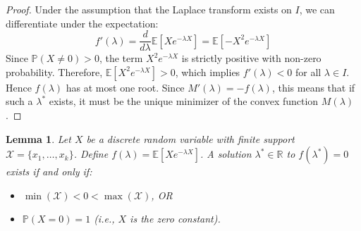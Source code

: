 \documentclass[12pt]{article}
\numberwithin{equation}{section}
\newtheorem{lemma}{Lemma}[section]
\begin{document}
\begin{proof}
    Under the assumption that the Laplace transform exists on \(I\), we can differentiate under the expectation:
    \[
    f'(\lambda) = \frac{d}{d\lambda}\mathbb{E}[Xe^{-\lambda X}] = \mathbb{E}[-X^2e^{-\lambda X}]
    \]
    Since \(\mathbb{P}(X\neq 0)>0\), the term \(X^2e^{-\lambda X}\) is strictly positive with non-zero probability. Therefore, \(\mathbb{E}[X^2e^{-\lambda X}]>0\), which implies \(f'(\lambda)<0\) for all \(\lambda \in I\). Hence \(f(\lambda)\) has at most one root. Since \(M'(\lambda) = - f(\lambda)\), this means that if such a \(\lambda^{*}\) exists, it must be the unique minimizer of the convex function \(M(\lambda)\).
\end{proof}

\begin{lemma}\label{existence_1}
    Let \(X\) be a discrete random variable with finite support \(\mathcal{X} = \{x_1,\ldots , x_k\}\). Define \(f(\lambda) = \mathbb{E}[Xe^{-\lambda X}]\). A solution \(\lambda^{*}\in\mathbb{R}\) to \(f(\lambda^{*}) = 0\) exists if and only if:
    \begin{itemize}
        \item \(\min(\mathcal{X}) < 0 < \max(\mathcal{X})\), OR
        \item \(\mathbb{P}(X=0) = 1\) (i.e., \(X\) is the zero constant).
    \end{itemize}
\end{lemma}
\end{document}
